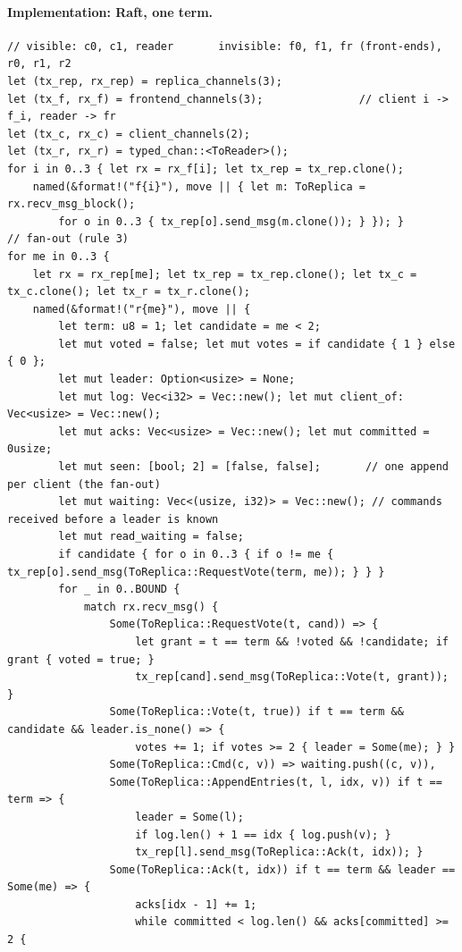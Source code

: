 \documentclass[11pt,a4paper]{article}
\begin{document}
\paragraph{Implementation: Raft, one term.}
\begin{lstlisting}
// visible: c0, c1, reader       invisible: f0, f1, fr (front-ends), r0, r1, r2
let (tx_rep, rx_rep) = replica_channels(3);
let (tx_f, rx_f) = frontend_channels(3);               // client i -> f_i, reader -> fr
let (tx_c, rx_c) = client_channels(2);
let (tx_r, rx_r) = typed_chan::<ToReader>();
for i in 0..3 { let rx = rx_f[i]; let tx_rep = tx_rep.clone();
    named(&format!("f{i}"), move || { let m: ToReplica = rx.recv_msg_block();
        for o in 0..3 { tx_rep[o].send_msg(m.clone()); } }); }          // fan-out (rule 3)
for me in 0..3 {
    let rx = rx_rep[me]; let tx_rep = tx_rep.clone(); let tx_c = tx_c.clone(); let tx_r = tx_r.clone();
    named(&format!("r{me}"), move || {
        let term: u8 = 1; let candidate = me < 2;
        let mut voted = false; let mut votes = if candidate { 1 } else { 0 };
        let mut leader: Option<usize> = None;
        let mut log: Vec<i32> = Vec::new(); let mut client_of: Vec<usize> = Vec::new();
        let mut acks: Vec<usize> = Vec::new(); let mut committed = 0usize;
        let mut seen: [bool; 2] = [false, false];       // one append per client (the fan-out)
        let mut waiting: Vec<(usize, i32)> = Vec::new(); // commands received before a leader is known
        let mut read_waiting = false;
        if candidate { for o in 0..3 { if o != me { tx_rep[o].send_msg(ToReplica::RequestVote(term, me)); } } }
        for _ in 0..BOUND {
            match rx.recv_msg() {
                Some(ToReplica::RequestVote(t, cand)) => {
                    let grant = t == term && !voted && !candidate; if grant { voted = true; }
                    tx_rep[cand].send_msg(ToReplica::Vote(t, grant)); }
                Some(ToReplica::Vote(t, true)) if t == term && candidate && leader.is_none() => {
                    votes += 1; if votes >= 2 { leader = Some(me); } }
                Some(ToReplica::Cmd(c, v)) => waiting.push((c, v)),
                Some(ToReplica::AppendEntries(t, l, idx, v)) if t == term => {
                    leader = Some(l);
                    if log.len() + 1 == idx { log.push(v); }
                    tx_rep[l].send_msg(ToReplica::Ack(t, idx)); }
                Some(ToReplica::Ack(t, idx)) if t == term && leader == Some(me) => {
                    acks[idx - 1] += 1;
                    while committed < log.len() && acks[committed] >= 2 {

\end{lstlisting}
\end{document}

